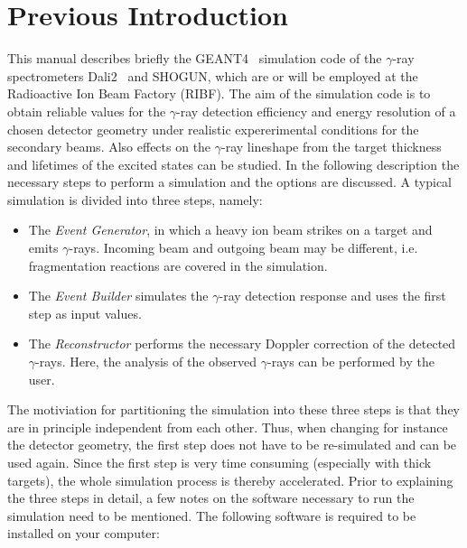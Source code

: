 \documentclass[12pt]{book}
\begin{document}
\section{Previous Introduction}
This manual describes briefly the GEANT4~\cite{GEANT4} simulation code of the $\gamma$-ray 
spectrometers Dali2~\cite{DALI} and SHOGUN, which are or will be employed at the Radioactive Ion Beam Factory (RIBF).
The aim of the simulation code is to obtain reliable values for the $\gamma$-ray detection efficiency
and energy resolution of a chosen detector geometry under realistic expererimental conditions
for the secondary beams. Also effects on the $\gamma$-ray lineshape from the target thickness and
lifetimes of the excited states can be studied. In the following description the necessary steps 
to perform a simulation and the options are discussed.\hfill{}
\linebreak{}
\linebreak{}
A typical simulation is divided into three steps, namely:
\begin{itemize}
\item The \textit{Event Generator}, in which a heavy ion beam strikes on a target and emits
  $\gamma$-rays. Incoming beam and outgoing beam may be different, i.e. fragmentation reactions
  are covered in the simulation.
\item The \textit{Event Builder} simulates the $\gamma$-ray detection response and uses the 
  first step as input values.
\item The \textit{Reconstructor} performs the necessary Doppler correction of the detected
  $\gamma$-rays. Here, the analysis of the observed $\gamma$-rays can be performed by the
  user.
\end{itemize}
The motiviation for partitioning the simulation into these three steps is that they are in principle
independent from each other. Thus, when changing for instance the detector geometry, the first step
does not have to be re-simulated and can be used again. 
Since the first step is very time consuming (especially with thick targets), the whole
simulation process is thereby accelerated.\hfill{}
\linebreak{}
\linebreak{}
Prior to explaining the three steps in detail, a few notes on the software necessary to run the simulation need
to be mentioned. The following software is required to be installed on your computer:
\end{document}
